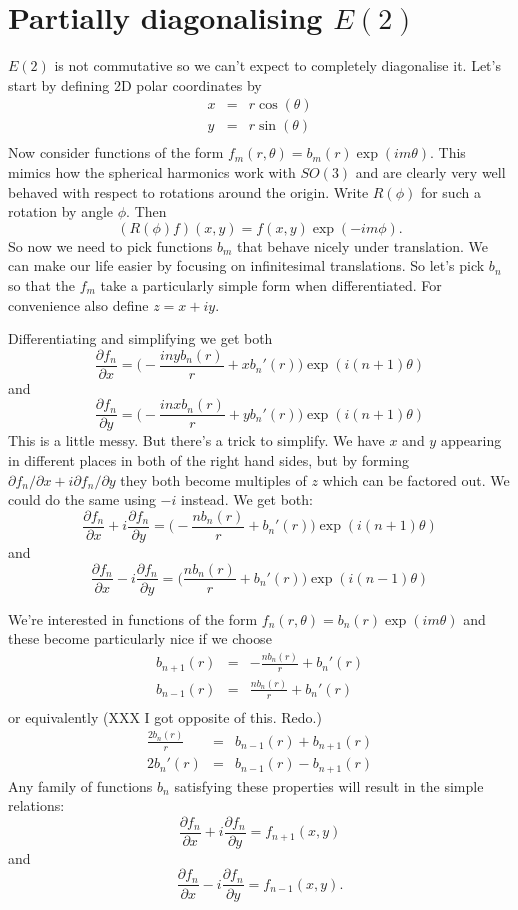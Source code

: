 \documentclass{article}
\begin{document}
\section{Partially diagonalising $E(2)$}
$E(2)$ is not commutative so we can't expect to completely diagonalise it.
Let's start by defining 2D polar coordinates by
\begin{align*}
x & = & r\cos(\theta) \\
y & = & r\sin(\theta) \\
\end{align*}
Now consider functions of the form $f_m(r,\theta)=b_m(r)\exp(im\theta)$.
This mimics how the spherical harmonics work with $SO(3)$ and are clearly very well behaved with respect to rotations around the origin.
Write $R(\phi)$ for such a rotation by angle $\phi$.
Then 
\[
(R(\phi)f)(x,y) = f(x,y)\exp(-im\phi).
\]
So now we need to pick functions $b_m$ that behave nicely under translation.
We can make our life easier by focusing on infinitesimal translations.
So let's pick $b_n$ so that the $f_m$ take a particularly simple form when differentiated.
For convenience also define $z=x+iy$.

Differentiating and simplifying we get both
\[
\frac{\partial f_n}{\partial x} = 
    \Big(-\frac{inyb_n(r)}{r}+xb_n'(r)\Big)\exp(i(n+1)\theta)
\]
and
\[
\frac{\partial f_n}{\partial y} = 
    \Big(-\frac{inxb_n(r)}{r}+yb_n'(r)\Big)\exp(i(n+1)\theta)
\]
This is a little messy.
But there's a trick to simplify.
We have $x$ and $y$ appearing in different places in both of the right hand sides, but by forming $\partial f_n/\partial x+i\partial f_n/\partial y$ they both become multiples of $z$ which can be factored out.
We could do the same using $-i$ instead.
We get both:
\[
\frac{\partial f_n}{\partial x}+i\frac{\partial f_n}{\partial y} =
    \Big(-\frac{nb_n(r)}{r}+b_n'(r)\Big)\exp(i(n+1)\theta)
\]
and
\[
\frac{\partial f_n}{\partial x}-i\frac{\partial f_n}{\partial y} =
    \Big(\frac{nb_n(r)}{r}+b_n'(r)\Big)\exp(i(n-1)\theta)
\]

We're interested in functions of the form
$f_n(r,\theta)=b_n(r)\exp(im\theta)$
and these become particularly nice if we choose
\begin{align*}
b_{n+1}(r) & = & -\frac{nb_n(r)}{r}+b_n'(r) \\
b_{n-1}(r) & = & \frac{nb_n(r)}{r}+b_n'(r) \\
\end{align*}
or equivalently
(XXX I got opposite of this. Redo.)
\begin{align}
\frac{2b_n(r)}{r} & = & b_{n-1}(r)+b_{n+1}(r) \\
2b_n'(r) & = & b_{n-1}(r)-b_{n+1}(r) \label{deriv}
\end{align}
Any family of functions $b_n$ satisfying these properties will result in the simple relations:
\[
\frac{\partial f_n}{\partial x}+i\frac{\partial f_n}{\partial y} =
    f_{n+1}(x,y)
\]
and
\[
\frac{\partial f_n}{\partial x}-i\frac{\partial f_n}{\partial y} =
    f_{n-1}(x,y).
\]
\end{document}
